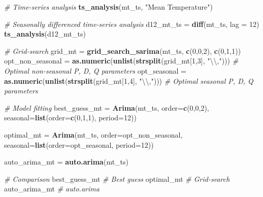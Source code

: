 \documentclass[
  11pt,
]{article}
\newenvironment{Shaded}{\begin{snugshade}}{\end{snugshade}}
\newcommand{\CharTok}[1]{\textcolor[rgb]{0.31,0.60,0.02}{#1}}
\newcommand{\CommentTok}[1]{\textcolor[rgb]{0.56,0.35,0.01}{\textit{#1}}}
\newcommand{\DataTypeTok}[1]{\textcolor[rgb]{0.13,0.29,0.53}{#1}}
\newcommand{\DecValTok}[1]{\textcolor[rgb]{0.00,0.00,0.81}{#1}}
\newcommand{\KeywordTok}[1]{\textcolor[rgb]{0.13,0.29,0.53}{\textbf{#1}}}
\newcommand{\NormalTok}[1]{#1}
\newcommand{\StringTok}[1]{\textcolor[rgb]{0.31,0.60,0.02}{#1}}
\begin{document}
\begin{Shaded}
\begin{Highlighting}[]
{{{\CommentTok{# Time-series analysis}
\KeywordTok{ts_analysis}\NormalTok{(mt_ts, }\StringTok{"Mean Temperature"}\NormalTok{)}

\CommentTok{# Seasonally differenced time-series analysis}
\NormalTok{d12_mt_ts =}\StringTok{ }\KeywordTok{diff}\NormalTok{(mt_ts, }\DataTypeTok{lag =} \DecValTok{12}\NormalTok{)}
\KeywordTok{ts_analysis}\NormalTok{(d12_mt_ts)}

\CommentTok{# Grid-search}
\NormalTok{grid_mt =}\StringTok{ }\KeywordTok{grid_search_sarima}\NormalTok{(mt_ts, }
                            \KeywordTok{c}\NormalTok{(}\DecValTok{0}\NormalTok{,}\DecValTok{0}\NormalTok{,}\DecValTok{2}\NormalTok{), }
                            \KeywordTok{c}\NormalTok{(}\DecValTok{0}\NormalTok{,}\DecValTok{1}\NormalTok{,}\DecValTok{1}\NormalTok{))}
\NormalTok{opt_non_seasonal =}\StringTok{ }\KeywordTok{as.numeric}\NormalTok{(}\KeywordTok{unlist}\NormalTok{(}\KeywordTok{strsplit}\NormalTok{(grid_mt[}\DecValTok{1}\NormalTok{,}\DecValTok{3}\NormalTok{], }\StringTok{"}\CharTok{\textbackslash{}\textbackslash{}}\StringTok{,"}\NormalTok{))) }\CommentTok{# Optimal non-seasonal P, D, Q parameters}
\NormalTok{opt_seasonal =}\StringTok{ }\KeywordTok{as.numeric}\NormalTok{(}\KeywordTok{unlist}\NormalTok{(}\KeywordTok{strsplit}\NormalTok{(grid_mt[}\DecValTok{1}\NormalTok{,}\DecValTok{4}\NormalTok{], }\StringTok{"}\CharTok{\textbackslash{}\textbackslash{}}\StringTok{,"}\NormalTok{))) }\CommentTok{# Optimal seasonal P, D, Q parameters}

\CommentTok{# Model fitting}
\NormalTok{best_guess_mt =}\StringTok{ }\KeywordTok{Arima}\NormalTok{(mt_ts,}
                   \DataTypeTok{order=}\KeywordTok{c}\NormalTok{(}\DecValTok{0}\NormalTok{,}\DecValTok{0}\NormalTok{,}\DecValTok{2}\NormalTok{),}
                   \DataTypeTok{seasonal=}\KeywordTok{list}\NormalTok{(}\DataTypeTok{order=}\KeywordTok{c}\NormalTok{(}\DecValTok{0}\NormalTok{,}\DecValTok{1}\NormalTok{,}\DecValTok{1}\NormalTok{), }\DataTypeTok{period=}\DecValTok{12}\NormalTok{))}

\NormalTok{optimal_mt =}\StringTok{ }\KeywordTok{Arima}\NormalTok{(mt_ts,}
                   \DataTypeTok{order=}\NormalTok{opt_non_seasonal,}
                   \DataTypeTok{seasonal=}\KeywordTok{list}\NormalTok{(}\DataTypeTok{order=}\NormalTok{opt_seasonal, }\DataTypeTok{period=}\DecValTok{12}\NormalTok{))}

\NormalTok{auto_arima_mt =}\StringTok{ }\KeywordTok{auto.arima}\NormalTok{(mt_ts)}

\CommentTok{# Comparison}
\NormalTok{best_guess_mt }\CommentTok{# Best guess}
\NormalTok{optimal_mt }\CommentTok{# Grid-search}
\NormalTok{auto_arima_mt }\CommentTok{# auto.arima}

}}}
\end{Highlighting}
\end{Shaded}
\end{document}
